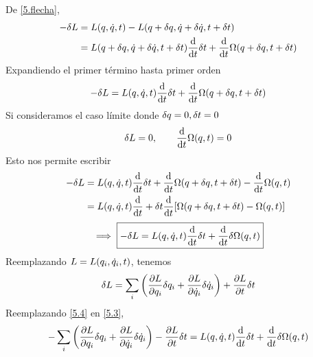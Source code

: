  De \eqref{5.flecha},
\begin{align}
  -\delta L&=L(q,\dot{q},t)-L(q+\delta q,\dot{q}+\delta\dot{q},t+\delta t)\\
  &=L(q+\delta q,\dot{q}+\delta\dot{q},t+\delta t)\dv{t}\delta t+\dv{t}\Omega(q+\delta q,t+\delta t)
\end{align}
Expandiendo el primer término hasta primer orden
\begin{equation}
  -\delta L=L(q,\dot{q},t)\dv{t}\delta t+\dv{t}\Omega(q+\delta q,t+\delta t)
\end{equation}
Si consideramos el caso límite donde $\delta q=0, \delta t=0$
\begin{equation}
  \delta L=0,\qquad \dv{t}\Omega(q,t)=0
\end{equation}
Esto nos permite escribir\begin{align}
  -\delta L&=L(q,\dot{q},t)\dv{t}\delta t+\dv{t}\Omega(q+\delta q,t+\delta t)-\dv{t}\Omega(q,t)\\
  &=L(q,\dot{q},t)\dv{t}+\delta t\dv{t}[\Omega(q+\delta q,t+\delta t)-\Omega(q,t)]
\end{align}
\begin{equation}\label{5.3}
  \implies \boxed{-\delta L=L(q,\dot{q},t)\dv{t}\delta t+\dv{t}\delta \Omega(q,t)}
\end{equation}
Reemplazando $L=L(q_i,\dot{q}_i,t)$, tenemos
\begin{equation}\label{5.4}
  \delta L=\sum_i\left(\pdv{L}{q_i}\delta q_i+\pdv{L}{\dot{q}_i}\delta \dot{q}_i\right)+\pdv{L}{t}\delta t
\end{equation}
Reemplazando \eqref{5.4} en \eqref{5.3},
\begin{equation}\label{5.5}
  -\sum_i\left(\pdv{L}{q_i}\delta q_i+\pdv{L}{\dot{q}_i}\delta \dot{q}_i\right)-\pdv{L}{t}\delta t=L(q,\dot{q},t)\dv{t}\delta t+\dv{t}\delta \Omega(q,t)
\end{equation}

